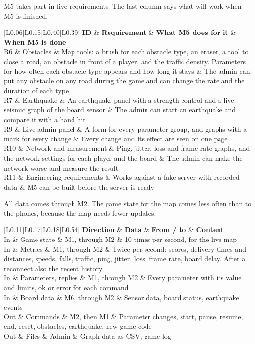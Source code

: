 \documentclass[
  english,
  10pt,
  a4paper,
]{article}
\newcommand{\ckkeep}[1]{\par\noindent\begin{minipage}{\linewidth}\setlength{\parskip}{4pt}#1\end{minipage}\par\smallskip}
\begin{document}
\ckkeep{%
M5 takes part in five requirements. The last column says what will work when M5 is finished.

\begin{tabular}{|L{0.06}|L{0.15}|L{0.40}|L{0.39}|}
\hline \textbf{ID} & \textbf{Requirement} & \textbf{What M5 does for it} & \textbf{When M5 is done} \\ \hline 
R6 & Obstacles & Map tools: a brush for each obstacle type, an eraser, a tool to close a road, an obstacle in front of a player, and the traffic density. Parameters for how often each obstacle type appears and how long it stays & The admin can put any obstacle on any road during the game and can change the rate and the duration of each type \\ \hline
R7 & Earthquake & An earthquake panel with a strength control and a live seismic graph of the board sensor & The admin can start an earthquake and compare it with a hand hit \\ \hline
R9 & Live admin panel & A form for every parameter group, and graphs with a mark for every change & Every change and its effect are seen on one page \\ \hline
R10 & Network and measurement & Ping, jitter, loss and frame rate graphs, and the network settings for each player and the board & The admin can make the network worse and measure the result \\ \hline
R11 & Engineering requirements & Works against a fake server with recorded data & M5 can be built before the server is ready \\ \hline
\end{tabular}}


\ckkeep{%
All data comes through M2. The game state for the map comes less often than to the phones, because
the map needs fewer updates.

\begin{tabular}{|L{0.11}|L{0.17}|L{0.18}|L{0.54}|}
\hline \textbf{Direction} & \textbf{Data} & \textbf{From / to} & \textbf{Content} \\ \hline 
In & Game state & M1, through M2 & 10 times per second, for the live map \\ \hline
In & Metrics & M1, through M2 & Twice per second: scores, delivery times and distances, speeds, falls, traffic, ping, jitter, loss, frame rate, board delay. After a reconnect also the recent history \\ \hline
In & Parameters, replies & M1, through M2 & Every parameter with its value and limits, ok or error for each command \\ \hline
In & Board data & M6, through M2 & Sensor data, board status, earthquake events \\ \hline
Out & Commands & M2, then M1 & Parameter changes, start, pause, resume, end, reset, obstacles, earthquake, new game code \\ \hline
Out & Files & Admin & Graph data as CSV, game log \\ \hline
\end{tabular}}
\end{document}

